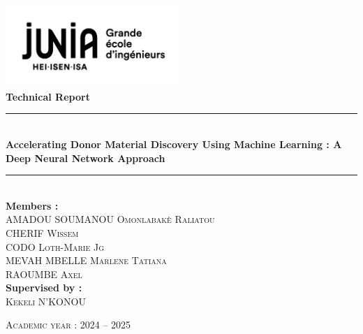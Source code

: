 


\begin{center}

    \includegraphics[width=0.5\textwidth]{PageGarde/junia.png}\\[1cm]

    {\Large \textbf{Technical Report}}\\[1cm]


    \rule{\textwidth}{0.5pt}\\[0.8cm]
    {\Huge \textbf{Accelerating Donor Material Discovery Using Machine Learning : A Deep Neural Network Approach}}\\[0.8cm]
    \rule{\textwidth}{0.5pt}\\[2cm]

    \textbf{Members :}\\
    \textsc{AMADOU SOUMANOU Omonlabakè Raliatou}\\
    \textsc{CHERIF Wissem}\\
    \textsc{CODO Loth-Marie Jg}\\
    \textsc{MEVAH MBELLE Marlene Tatiana}\\
    \textsc{RAOUMBE Axel}\\[3cm]

    \textbf{Supervised by :}\\
    \textsc{Kekeli N'KONOU}\\[1cm] %

    \vfill

    


    {\large \textsc{Academic year : 2024 – 2025}}
    
\end{center}

